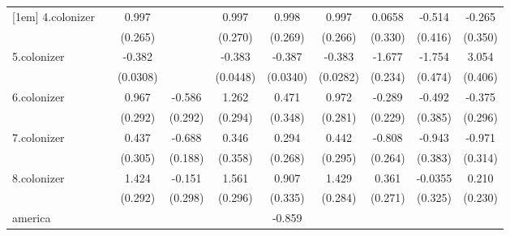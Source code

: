 {\begin{tabular}{l*{9}{c}}
[1em]
4.colonizer &                     &       0.997\sym{***}&                     &       0.997\sym{***}&       0.998\sym{***}&       0.997\sym{***}&      0.0658         &      -0.514         &      -0.265         \\
            &                     &     (0.265)         &                     &     (0.270)         &     (0.269)         &     (0.266)         &     (0.330)         &     (0.416)         &     (0.350)         \\
[1em]
5.colonizer &                     &      -0.382\sym{***}&                     &      -0.383\sym{***}&      -0.387\sym{***}&      -0.383\sym{***}&      -1.677\sym{***}&      -1.754\sym{***}&       3.054\sym{***}\\
            &                     &    (0.0308)         &                     &    (0.0448)         &    (0.0340)         &    (0.0282)         &     (0.234)         &     (0.474)         &     (0.406)         \\
[1em]
6.colonizer &                     &       0.967\sym{***}&      -0.586\sym{*}  &       1.262\sym{***}&       0.471         &       0.972\sym{***}&      -0.289         &      -0.492         &      -0.375         \\
            &                     &     (0.292)         &     (0.292)         &     (0.294)         &     (0.348)         &     (0.281)         &     (0.229)         &     (0.385)         &     (0.296)         \\
[1em]
7.colonizer &                     &       0.437         &      -0.688\sym{***}&       0.346         &       0.294         &       0.442         &      -0.808\sym{***}&      -0.943\sym{**} &      -0.971\sym{***}\\
            &                     &     (0.305)         &     (0.188)         &     (0.358)         &     (0.268)         &     (0.295)         &     (0.264)         &     (0.383)         &     (0.314)         \\
[1em]
8.colonizer &                     &       1.424\sym{***}&      -0.151         &       1.561\sym{***}&       0.907\sym{***}&       1.429\sym{***}&       0.361         &     -0.0355         &       0.210         \\
            &                     &     (0.292)         &     (0.298)         &     (0.296)         &     (0.335)         &     (0.284)         &     (0.271)         &     (0.325)         &     (0.230)         \\
[1em]
america     &                     &                     &                     &                     &      -0.859         &                     &                     &                     &                     \\

\end{tabular}}
